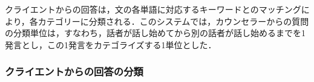 \documentclass[shuuron]{kuee}
\begin{document}



クライエントからの回答は，文の各単語に対応するキーワードとのマッチングにより，各カテゴリーに分類される．このシステムでは，カウンセラーからの質問の分類単位は，すなわち，話者が話し始めてから別の話者が話し始めるまでを1発言とし，この1発言をカテゴライズする1単位とした．






\subsubsection{クライエントからの回答の分類}
\end{document}
